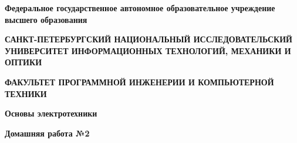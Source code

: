 \documentclass[12pt]{article}
\begin{document}
    \pagestyle{empty}
    \begin{center}
        \normalsize
        \textbf{Федеральное государственное автономное образовательное учреждение высшего образования}

        \small
        \medskip
        \textbf{САНКТ-ПЕТЕРБУРГСКИЙ НАЦИОНАЛЬНЫЙ ИССЛЕДОВАТЕЛЬСКИЙ  УНИВЕРСИТЕТ ИНФОРМАЦИОННЫХ ТЕХНОЛОГИЙ, МЕХАНИКИ И ОПТИКИ}

        \medskip
        \textbf{ФАКУЛЬТЕТ ПРОГРАММНОЙ ИНЖЕНЕРИИ И КОМПЬЮТЕРНОЙ ТЕХНИКИ}
        \bigskip\bigskip\bigskip\bigskip\bigskip\bigskip\bigskip\bigskip\bigskip\bigskip\bigskip\bigskip
        \par\medskip\par\smallskip\par\smallskip
        \Large
        \textbf{Основы электротехники}

        \textbf{Домашняя работа №2}


\end{center}
\end{document}
